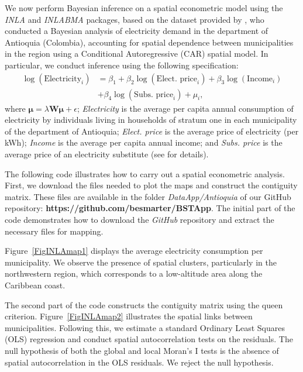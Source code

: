 We now perform Bayesian inference on a spatial econometric model using the \textit{INLA} and \textit{INLABMA} packages, based on the dataset provided by \cite{ramirez2019welfare}, who conducted a Bayesian analysis of electricity demand in the department of Antioquia (Colombia), accounting for spatial dependence between municipalities in the region using a Conditional Autoregressive (CAR) spatial model. In particular, we conduct inference using the following specification:
\begin{align*}
	\log(\text{Electricity}_i)&=\beta_1+\beta_2\log(\text{Elect. price}_i)+\beta_3\log(\text{Income}_i)\\
	&+\beta_4\log(\text{Subs. price}_i)+\mu_i,
\end{align*} 
where \( \boldsymbol{\mu} = \lambda \boldsymbol{W} \boldsymbol{\mu} + \epsilon \); \textit{Electricity} is the average per capita annual consumption of electricity by individuals living in households of stratum one in each municipality of the department of Antioquia; \textit{Elect. price} is the average price of electricity (per kWh); \textit{Income} is the average per capita annual income; and \textit{Subs. price} is the average price of an electricity substitute (see \cite{ramirez2019welfare} for details).

The following code illustrates how to carry out a spatial econometric analysis. First, we download the files needed to plot the maps and construct the contiguity matrix. These files are available in the folder \textit{DataApp/Antioquia} of our GitHub repository: \textbf{https://github.com/besmarter/BSTApp}. The initial part of the code demonstrates how to download the \textit{GitHub} repository and extract the necessary files for mapping.

Figure~\ref{FigINLAmap1} displays the average electricity consumption per municipality. We observe the presence of spatial clusters, particularly in the northwestern region, which corresponds to a low-altitude area along the Caribbean coast.

The second part of the code constructs the contiguity matrix using the queen criterion. Figure~\ref{FigINLAmap2} illustrates the spatial links between municipalities. Following this, we estimate a standard Ordinary Least Squares (OLS) regression and conduct spatial autocorrelation tests on the residuals. The null hypothesis of both the global and local Moran's I tests is the absence of spatial autocorrelation in the OLS residuals. We reject the null hypothesis.

